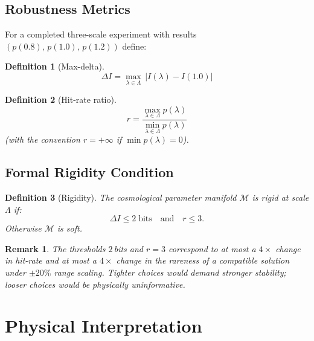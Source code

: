 \documentclass[12pt]{article}
\newtheorem{definition}{Definition}[section]
\newtheorem{remark}{Remark}[section]
\newcommand{\calM}{\mathcal{M}}
\begin{document}
\subsection{Robustness Metrics}

For a completed three-scale experiment with results
$(p(0.8),\,p(1.0),\,p(1.2))$ define:

\begin{definition}[Max-delta]
\label{def:max_delta}
\begin{equation}
  \Delta I
  = \max_{\lambda\in\Lambda}\,|I(\lambda) - I(1.0)|
  \label{eq:Delta_I}
\end{equation}
\end{definition}

\begin{definition}[Hit-rate ratio]
\label{def:hit_ratio}
\begin{equation}
  r = \frac{\max_{\lambda\in\Lambda} p(\lambda)}{\min_{\lambda\in\Lambda} p(\lambda)}
  \label{eq:ratio_r}
\end{equation}
(with the convention $r=+\infty$ if $\min p(\lambda)=0$).
\end{definition}

\subsection{Formal Rigidity Condition}

\begin{definition}[Rigidity]
\label{def:rigidity}
The cosmological parameter manifold $\calM$ is \emph{rigid at scale $\Lambda$} if:
\begin{equation}
  \boxed{
    \Delta I \leq 2\;\text{bits}
    \quad\text{and}\quad
    r \leq 3.
  }
  \label{eq:rigidity}
\end{equation}
Otherwise $\calM$ is \emph{soft}.
\end{definition}

\begin{remark}
The thresholds $2$\,bits and $r=3$ correspond to at most a $4\times$ change in
hit-rate and at most a $4\times$ change in the rareness of a compatible solution
under $\pm 20\%$ range scaling.  Tighter choices would demand stronger stability;
looser choices would be physically uninformative.
\end{remark}

\section{Physical Interpretation}
\end{document}
